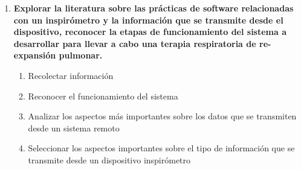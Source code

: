 \begin{enumerate}
  \item \textbf{Explorar la literatura sobre las pr\'acticas de software relacionadas con un inspir\'ometro y la informaci\'on que se transmite desde el dispositivo, reconocer la etapas de funcionamiento del sistema a desarrollar para llevar a cabo una terapia respiratoria de re-expansi\'on pulmonar.}
  \begin{enumerate}
    \item Recolectar informaci\'on 
    \item Reconocer el funcionamiento del sistema
    \item Analizar los aspectos m\'as importantes sobre los datos que se transmiten desde un sistema remoto
    \item Seleccionar los aspectos importantes sobre el tipo de informaci\'on que se transmite desde un dispositivo inspir\'ometro
    

\end{enumerate}
\end{enumerate}
